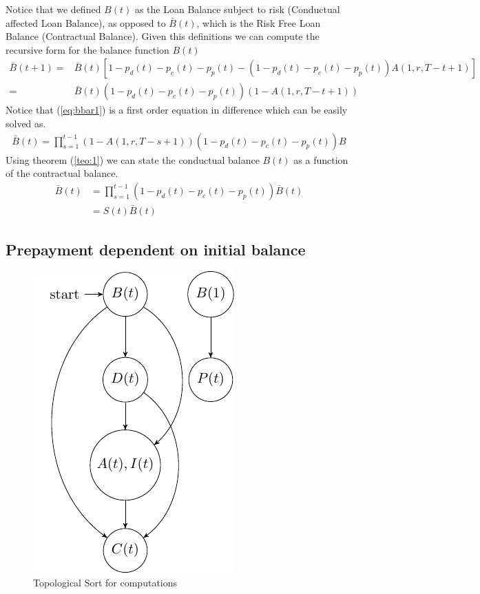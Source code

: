 \documentclass[12pt]{book}
\begin{document}
Notice that we defined $B(t)$ as the Loan Balance subject to risk (Conductual affected Loan Balance), as opposed to $\bar{B}(t)$, which is the Risk Free Loan Balance (Contractual Balance).  Given this definitions we can compute the recursive form for the balance function $B(t)$
\begin{align}
\bar{B}(t+1) =& \bar{B}(t)[1-p_d(t)-p_c(t)-p_p(t)-(1-p_d(t)-p_c(t)-p_p(t))A(1,r,T-t+1) ] \nonumber\\
     =&
    \bar{B}(t)(1-p_d(t)-p_c(t)-p_p(t))(1-A(1,r,T-t+1)) \label{eq:bbar1}\
\end{align}
Notice that (\ref{eq:bbar1}) is a first order equation in difference which can be easily solved as.
\begin{align}
    \bar{B}(t) =\prod^{t-1}_{s=1} (1-A(1,r,T-s+1))(1-p_d(t)-p_c(t)-p_p(t))B
\end{align}
Using theorem (\ref{teo:1}) we can state the conductual balance $B(t)$ as a function of the contractual balance.
\begin{align}
    \bar{B}(t) &=\prod^{t-1}_{s=1} (1-p_d(t)-p_c(t)-p_p(t))\bar{B}(t)\\
    &=S(t)\bar{B}(t)
\end{align}

\subsection{Prepayment dependent on initial balance}
\begin{figure}[H]
  \centering
      \includegraphics[width=.3\textwidth]{Graph1.pdf} 
 \caption{Topological Sort for computations}
 \label{fig:Test}
\end{figure}
\end{document}
